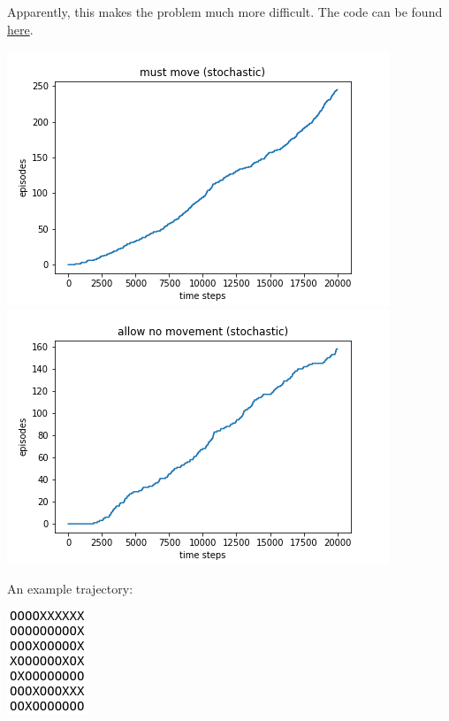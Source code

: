 \documentclass[12pt,a4paper]{article}
\begin{document}
\begin{enumerate}
Apparently, this makes the problem much more difficult. The code can be found \href{https://github.com/hannagabor/SBRL/blob/6.9/windy_gridworld.ipynb}{here}.

\begin{center}
  \includegraphics[scale=0.8]{stochastic_must_move_plot}
  \includegraphics[scale=0.8]{stochastic_no_movement_plot}
\end{center}

An example trajectory:
\begin{center}
\includegraphics[scale=0.8]{stochastic_trajectory}
\end{center}

\end{enumerate}
\end{document}
